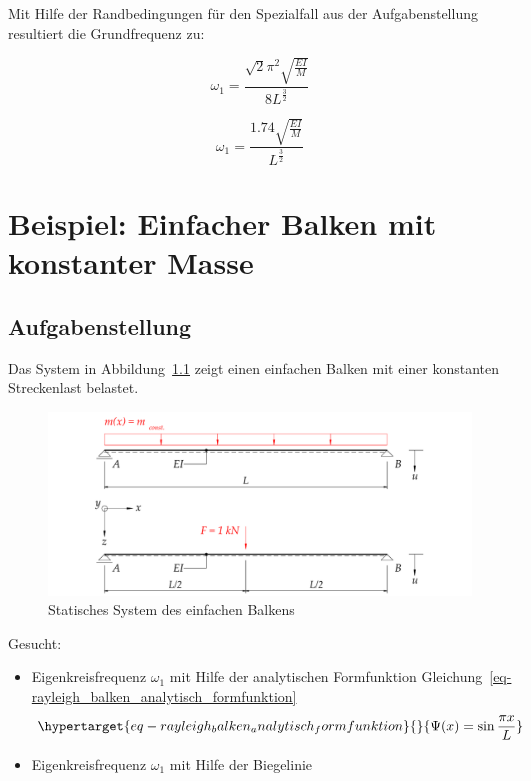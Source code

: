 \documentclass[
  letterpaper,
  DIV=11]{scrreprt}
\providecommand{\tightlist}{%
  \setlength{\itemsep}{0pt}\setlength{\parskip}{0pt}}\usepackage{longtable,booktabs,array}
\begin{document}
Mit Hilfe der Randbedingungen für den Spezialfall aus der
Aufgabenstellung resultiert die Grundfrequenz zu:

\begin{equation}\omega_{1} = \frac{\sqrt{2} \pi^{2} \sqrt{\frac{E I}{M}}}{8 L^{\frac{3}{2}}}\end{equation}

\begin{equation}\omega_{1} = \frac{1.74 \sqrt{\frac{E I}{M}}}{L^{\frac{3}{2}}}\end{equation}

\hypertarget{beispiel-einfacher-balken-mit-konstanter-masse}{%
\chapter{Beispiel: Einfacher Balken mit konstanter
Masse}\label{beispiel-einfacher-balken-mit-konstanter-masse}}

\hypertarget{aufgabenstellung-2}{%
\section{Aufgabenstellung}\label{aufgabenstellung-2}}

Das System in Abbildung~\ref{fig-rayleigh_balken_system} zeigt einen
einfachen Balken mit einer konstanten Streckenlast belastet.

\begin{figure}[H]

{\centering \includegraphics{index_files/mediabag/bilder/aufgabe_rayleigh_balken.pdf}

}

\caption{\label{fig-rayleigh_balken_system}Statisches System des
einfachen Balkens}

\end{figure}

Gesucht:

\begin{itemize}
\tightlist
\item
  Eigenkreisfrequenz \(\omega_1\) mit Hilfe der analytischen
  Formfunktion
  Gleichung~\ref{eq-rayleigh_balken_analytisch_formfunktion}
  \begin{equation}\protect\hypertarget{eq-rayleigh_balken_analytisch_formfunktion}{}{
  \Psi(x) = \sin{\frac{\pi x}{L}}
  }\label{eq-rayleigh_balken_analytisch_formfunktion}\end{equation}
\item
  Eigenkreisfrequenz \(\omega_1\) mit Hilfe der Biegelinie
\end{itemize}
\end{document}
